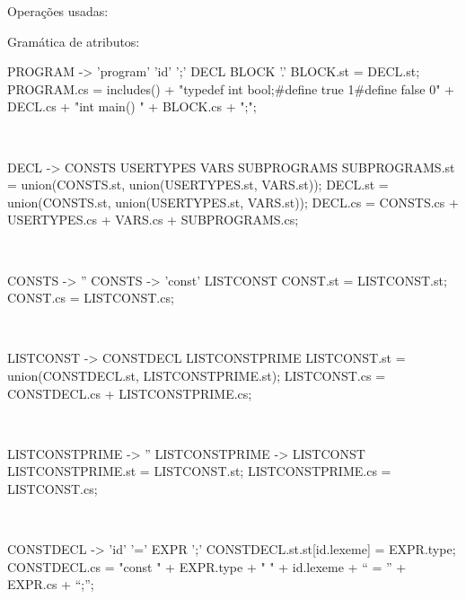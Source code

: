 Operações usadas:

%
{\scriptsize}

Gramática de atributos:\\

\begin{verbbox}[\scriptsize]
PROGRAM -> 'program' 'id' ';' DECL BLOCK '.'
{
BLOCK.st = DECL.st; PROGRAM.cs = includes() +
"typedef int bool;\n#define true 1\n#define false 0\n\n" +
DECL.cs + "int main() {\n" + BLOCK.cs + ";\n}\n";
}
\end{verbbox}
\theverbbox\\

\begin{verbbox}[\scriptsize]
DECL -> CONSTS USERTYPES VARS SUBPROGRAMS
{
SUBPROGRAMS.st = union(CONSTS.st, union(USERTYPES.st, VARS.st));
DECL.st = union(CONSTS.st, union(USERTYPES.st, VARS.st));
DECL.cs = CONSTS.cs + USERTYPES.cs + VARS.cs + SUBPROGRAMS.cs;
}
\end{verbbox} 
\theverbbox\\

\begin{verbbox}[\scriptsize]
CONSTS -> '' {}
CONSTS -> 'const' LISTCONST
{
CONST.st = LISTCONST.st;
CONST.cs = LISTCONST.cs;
}
\end{verbbox} 
\theverbbox\\

\begin{verbbox}[\scriptsize]
LISTCONST -> CONSTDECL LISTCONSTPRIME
{
LISTCONST.st = union(CONSTDECL.st, LISTCONSTPRIME.st);
LISTCONST.cs = CONSTDECL.cs + LISTCONSTPRIME.cs;
}
\end{verbbox} 
\theverbbox\\

\begin{verbbox}[\scriptsize]
LISTCONSTPRIME -> '' {}
LISTCONSTPRIME -> LISTCONST
{
LISTCONSTPRIME.st = LISTCONST.st;
LISTCONSTPRIME.cs = LISTCONST.cs;
}
\end{verbbox} 
\theverbbox\\

\begin{verbbox}[\scriptsize]
CONSTDECL -> 'id' '=' EXPR ';'
{
CONSTDECL.st.st[id.lexeme] = EXPR.type;
CONSTDECL.cs  = "const " + EXPR.type + " " + id.lexeme + “ = ” +  EXPR.cs + “;\n”;
}
\end{verbbox} 
\theverbbox\\

